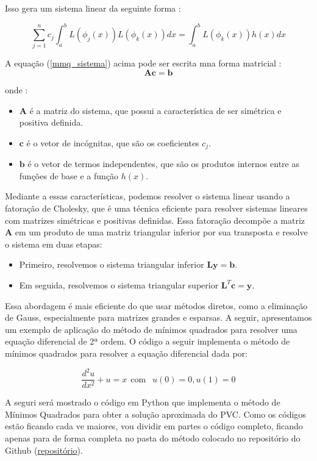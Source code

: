 \documentclass[a4paper, 12pt]{article}
\numberwithin{equation}{section}
\begin{document}
Isso gera um sistema linear da seguinte forma : 

\begin{equation}
    \sum_{j = 1}^{n} c_j \int_{a}^{b} L\left(\phi_j(x)\right) L\left(\phi_k(x)\right) dx  = \int_{a}^{b} L\left(\phi_k(x)\right) h(x) dx  \label{mmq_sistema}
\end{equation}


A equação (\ref{mmq_sistema}) acima pode ser escrita mna forma matricial :
\begin{equation}
    \mathbf{A}\mathbf{c} = \mathbf{b}
\end{equation}

onde : 

\begin{itemize}
    \item $\mathbf{A}$ é a matriz do sistema, que possui a característica de ser simétrica e positiva definida.
    \item $\mathbf{c}$ é o vetor de incógnitas, que são os coeficientes $c_j$.
    \item $\mathbf{b}$ é o vetor de termos independentes, que são os produtos internos entre as funções de base e a função $h(x)$.
\end{itemize}


Mediante a essas características, podemos  resolver o sistema linear usando a fatoração de Cholesky, que é uma técnica eficiente para resolver sistemas lineares com matrizes simétricas e positivas definidas. 
Essa fatoração decompõe a matriz $\mathbf{A}$ 
em um produto de uma matriz triangular inferior por sua transposta e resolve o sistema em duas etapas:
\begin{itemize}
    \item Primeiro, resolvemos o sistema triangular inferior $\mathbf{L}\mathbf{y} = \mathbf{b}$.
    \item Em seguida, resolvemos o sistema triangular superior $\mathbf{L}^T\mathbf{c} = \mathbf{y}$.
\end{itemize}
Essa abordagem é mais eficiente do que usar métodos diretos, como a eliminação de Gauss, especialmente para matrizes grandes e esparsas.
A seguir, apresentamos um exemplo de aplicação do método de mínimos quadrados para resolver uma equação diferencial de 2ª ordem. 
O código a seguir implementa o método de mínimos quadrados para resolver a equação diferencial dada por:


$$\dfrac{d^2u}{dx^2} + u = x   \ \ \textrm{com } \ \ u(0) = 0, u(1) = 0$$

A seguri será mostrado o código em Python que implementa o método de Mínimos Quadrados para obter 
a solução aproximada do PVC. Como os códigos estão ficando cada ve maiores, vou dividir em partes 
o código completo, ficando apenas para de forma completa no pasta do método colocado no repositório 
do Github (\href{https://github.com/Marcelo-Lucas22/residuos-ponderados}{repositório}). 
\end{document}
